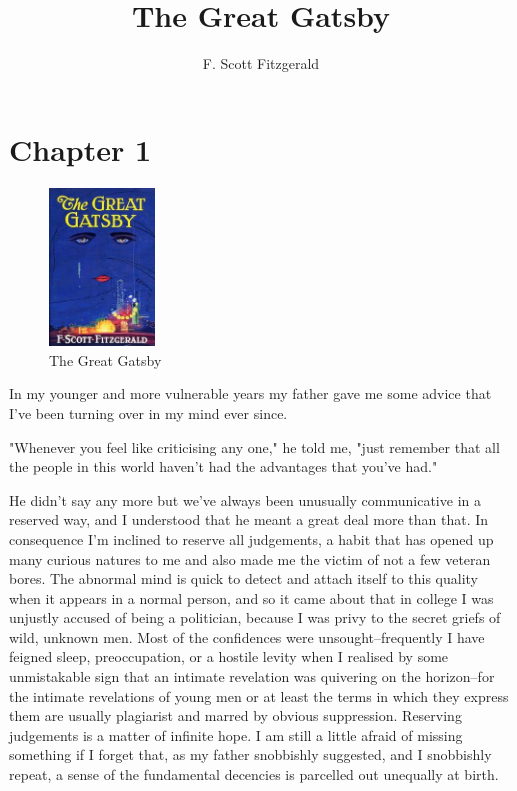 \documentclass[a4paper,12pt]{article}
\title{The Great Gatsby}
\author{F. Scott Fitzgerald}
\date{}
\begin{document}
\maketitle
\section{Chapter 1}

\begin{figure}[b!]
   \centering
     \includegraphics[width=0.25\textwidth]{images/jacket.jpg}
   \caption{The Great Gatsby}
\end{figure}

In my younger and more vulnerable years my father gave me some advice that I've been turning over in my mind ever since.

"Whenever you feel like criticising any one," he told me, "just
remember that all the people in this world haven't had the advantages
that you've had."

He didn't say any more but we've always been unusually communicative
in a reserved way, and I understood that he meant a great deal more
than that. In consequence I'm inclined to reserve all judgements,
a habit that has opened up many curious natures to me and also
made me the victim of not a few veteran bores. The abnormal mind
is quick to detect and attach itself to this quality when it
appears in a normal person, and so it came about that in college I
was unjustly accused of being a politician, because I was privy to the
secret griefs of wild, unknown men. Most of the confidences were
unsought--frequently I have feigned sleep, preoccupation, or a hostile
levity when I realised by some unmistakable sign that an intimate
revelation was quivering on the horizon--for the intimate revelations
of young men or at least the terms in which they express them are
usually plagiarist and marred by obvious suppression. Reserving
judgements is a matter of infinite hope. I am still a little afraid of
missing something if I forget that, as my father snobbishly suggested,
and I snobbishly repeat, a sense of the fundamental decencies is
parcelled out unequally at birth.
\end{document}

